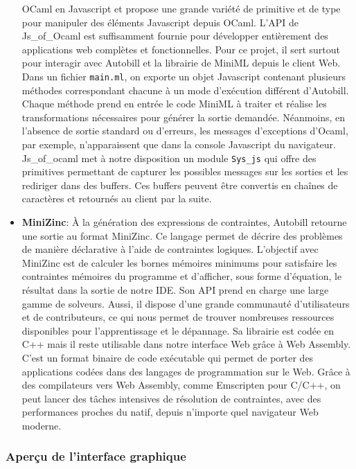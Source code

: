 \documentclass[
  12pt,
]{article}
\begin{document}
\begin{itemize}
  OCaml en Javascript et propose une grande variété de primitive et de
  type pour manipuler des éléments Javascript depuis OCaml. L'API de
  Js\_of\_Ocaml est suffisamment fournie pour développer entièrement des
  applications web complètes et fonctionnelles. Pour ce projet, il sert
  surtout pour interagir avec Autobill et la librairie de MiniML depuis
  le client Web. Dans un fichier \texttt{main.ml}, on exporte un objet
  Javascript contenant plusieurs méthodes correspondant chacune à un
  mode d'exécution différent d'Autobill. Chaque méthode prend en entrée
  le code MiniML à traiter et réalise les transformations nécessaires
  pour générer la sortie demandée. Néanmoins, en l'absence de sortie
  standard ou d'erreurs, les messages d'exceptions d'Ocaml, par exemple,
  n'apparaissent que dans la console Javascript du navigateur.
  Js\_of\_ocaml met à notre disposition un module \texttt{Sys\_js} qui
  offre des primitives permettant de capturer les possibles messages sur
  les sorties et les rediriger dans des buffers. Ces buffers peuvent
  être convertis en chaînes de caractères et retournés au client par la
  suite.
\item
  \textbf{MiniZinc}: À la génération des expressions de contraintes,
  Autobill retourne une sortie au format MiniZinc. Ce langage permet de
  décrire des problèmes de manière déclarative à l'aide de contraintes
  logiques. L'objectif avec MiniZinc est de calculer les bornes mémoires
  minimums pour satisfaire les contraintes mémoires du programme et
  d'afficher, sous forme d'équation, le résultat dans la sortie de notre
  IDE. Son API prend en charge une large gamme de solveurs. Aussi, il
  dispose d'une grande communauté d'utilisateurs et de contributeurs, ce
  qui nous permet de trouver nombreuses ressources disponibles pour
  l'apprentissage et le dépannage. Sa librairie est codée en C++ mais il
  reste utilisable dans notre interface Web grâce à Web Assembly. C'est
  un format binaire de code exécutable qui permet de porter des
  applications codées dans des langages de programmation sur le Web.
  Grâce à des compilateurs vers Web Assembly, comme Emscripten pour
  C/C++, on peut lancer des tâches intensives de résolution de
  contraintes, avec des performances proches du natif, depuis n'importe
  quel navigateur Web moderne.
\end{itemize}

\hypertarget{aperuxe7u-de-linterface-graphique}{%
\subsubsection{Aperçu de l'interface
graphique}\label{aperuxe7u-de-linterface-graphique}}
\end{document}
